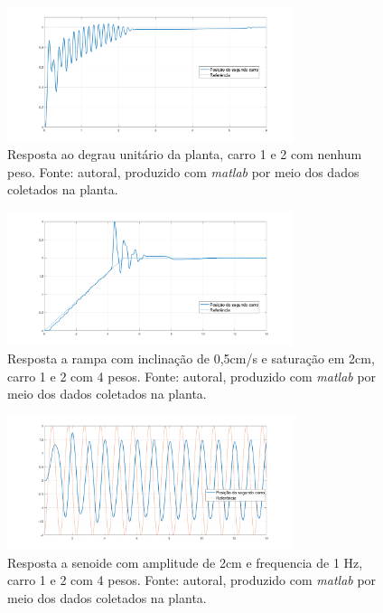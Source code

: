 \documentclass{ifacconf}
\begin{document}
\begin{figure}[!htb]
  \begin{center}
  \includegraphics[width=8.4cm]{figures/resultado_teste3.png}    %
  \caption{Resposta ao degrau unitário da planta, carro 1 e 2 com nenhum peso. Fonte: autoral, produzido com \textit{matlab} por meio dos dados coletados na planta.} 
  \label{fig:teste_step1_c1_0p_c2_0p}
  \end{center}
\end{figure}

\begin{figure}[!htb]
  \begin{center}
  \includegraphics[width=8.4cm]{figures/resultado_teste5.png}    %
  \caption{Resposta a rampa com inclinação de 0,5cm/s e saturação em 2cm, carro 1 e 2 com 4 pesos. Fonte: autoral, produzido com \textit{matlab} por meio dos dados coletados na planta.} 
  \label{fig:teste_ramp1_c1_4p_c2_4p}
  \end{center}
\end{figure}

\begin{figure}[!htb]
  \begin{center}
  \includegraphics[width=8.4cm]{figures/resultado_teste6.png}    %
  \caption{Resposta a senoide com amplitude de 2cm e frequencia de 1 Hz, carro 1 e 2 com 4 pesos. Fonte: autoral, produzido com \textit{matlab} por meio dos dados coletados na planta.} 
  \label{fig:teste_sin1_c1_4p_c2_4p}
  \end{center}
\end{figure}
\end{document}
